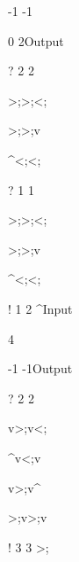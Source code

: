\documentclass{article}
\begin{document}
-1 -1









0 2Output



? 2 2

>;>;<;

>;>;v

^<;<;



? 1 1

>;>;<;

>;>;v

^<;<;



! 1 2 ^Input

4











-1 -1Output



? 2 2

v>;v<;

^v<;v

v>;v^

>;v>;v



! 3 3 >;
\end{document}
